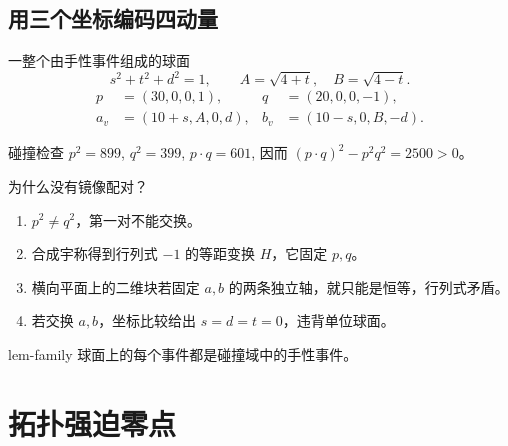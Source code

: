 \documentclass{beamer}
\begin{document}
\subsection{用三个坐标编码四动量}
\begin{frame}{一整个由手性事件组成的球面}
  \[
  s^2+t^2+d^2=1,\qquad
  A=\sqrt{4+t},\quad B=\sqrt{4-t}.
  \]
  \[
  \begin{aligned}
  p&=(30,0,0,1),&q&=(20,0,0,-1),\\
  a_v&=(10+s,A,0,d),&b_v&=(10-s,0,B,-d).
  \end{aligned}
  \]
  \begin{block}{碰撞检查}
  $p^2=899$, $q^2=399$, $p\cdot q=601$, 因而
  $(p\cdot q)^2-p^2q^2=2500>0$。
  \end{block}
\end{frame}
\begin{frame}{为什么没有镜像配对？}
  \begin{enumerate}
    \item $p^2\ne q^2$，第一对不能交换。
    \item 合成宇称得到行列式 $-1$ 的等距变换 $H$，它固定 $p,q$。
    \item 横向平面上的二维块若固定 $a,b$ 的两条独立轴，就只能是恒等，行列式矛盾。
    \item 若交换 $a,b$，坐标比较给出 $s=d=t=0$，违背单位球面。
  \end{enumerate}
  \begin{bookresult}{lem-family}
    球面上的每个事件都是碰撞域中的手性事件。
  \end{bookresult}
\end{frame}
\section{拓扑强迫零点}
\end{document}
